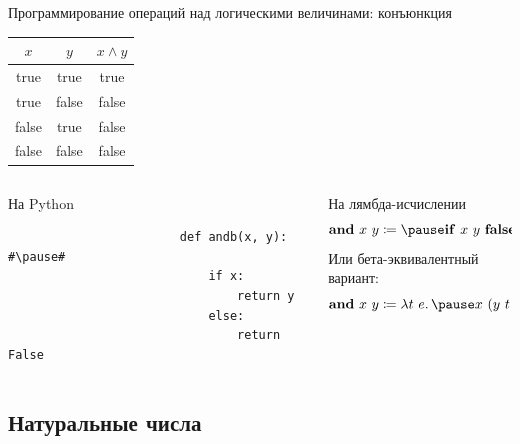     \begin{frame}[fragile]{Программирование операций над логическими величинами: конъюнкция}
        \begin{center}
            \begin{tabular}{|c|c|c|}
                \hline
                $x$   & $y$   & $x \land y$ \\ \hline
                true  & true  & true        \\
                true  & false & false       \\
                false & true  & false       \\
                false & false & false       \\ \hline
            \end{tabular}
        \end{center}
        \begin{columns}[onlytextwidth]
            \begin{column}[t]{0.485\textwidth}
                \begin{block}{На Python}
                    \begin{verbatim}
                        def andb(x, y): #\pause#
                            if x:
                                return y
                            else:
                                return False
                    \end{verbatim}
                \end{block}
            \end{column}\hfill
            \pause%
            \begin{column}[t]{0.485\textwidth}
                \begin{block}{На лямбда-исчислении}
                    \[
                        \term{and} ~x~y \termdef \pause \term{if} \ap x \ap y \ap \term{false}
                    \]
                    \pause
                    Или бета-эквивалентный вариант:
                    \[\term{and}~x~y \termdef \lambda t~e\ldotp \pause x~(y~t~e)~e\]
                    \vspace{-1em}
                \end{block}
            \end{column}
        \end{columns}
    \end{frame}

    \subsection{Натуральные числа}

